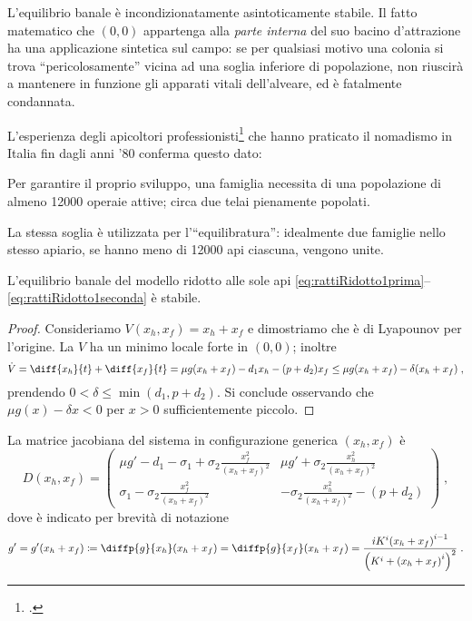 L'equilibrio banale è incondizionatamente asintoticamente stabile.
Il fatto matematico che $(0,0)$ appartenga alla \emph{parte interna} del suo bacino d'attrazione
ha una applicazione sintetica sul campo: se per qualsiasi motivo una colonia si trova ``pericolosamente''
vicina ad una soglia inferiore di popolazione, non riuscirà a mantenere in funzione gli apparati vitali
dell'alveare, ed è fatalmente condannata.

L'esperienza degli apicoltori professionisti\footcite{privFDL,privFPan} che hanno praticato il nomadismo in Italia
fin dagli anni '80 conferma questo dato:
\begin{displayquote}
Per garantire il proprio sviluppo, una famiglia necessita di una popolazione di
almeno 12000 operaie attive; circa due telai pienamente popolati.

La stessa soglia è utilizzata per l'``equilibratura'': idealmente due famiglie nello stesso apiario,
se hanno meno di 12000 api ciascuna, vengono unite.
\end{displayquote}

\begin{proposizione}
    L'equilibrio banale del modello ridotto alle sole api
    \eqref{eq:rattiRidotto1prima}--\eqref{eq:rattiRidotto1seconda}
    è stabile.
    \label{prop:r0Stab2d}
\end{proposizione}

\begin{proof}
Consideriamo $V(x_h, x_f) = x_h + x_f$ e dimostriamo che è di Lyapounov per l'origine.
La $V$ ha un minimo locale forte in $(0,0)$; inoltre
$$\dot{V} = \diff{x_h}{t} + \diff{x_f}{t} = \mu g(x_h + x_f) -d_1 x_h - (p+d_2) x_f
\leq
 \mu g(x_h + x_f) - \delta (x_h + x_f)
\; ,$$
prendendo $0 < \delta \leq \min (d_1, p + d_2)$.
Si conclude osservando che $\mu g(x) - \delta x <0$ per $x>0$ sufficientemente piccolo.
\end{proof}

La matrice jacobiana del sistema in configurazione generica $(x_h, x_f)$ è
\begin{equation}
    D(x_h, x_f) =
    \begin{pmatrix}
        \mu g' -d_1 - \sigma_1 + \sigma_2 \frac{x_f^2}{{(x_h+x_f)}^2}
        & \mu g' + \sigma_2 \frac{x_h^2}{{(x_h+x_f)}^2}
        \\
        \sigma_1 - \sigma_2 \frac{x_f^2}{{(x_h+x_f)}^2}
        & - \sigma_2 \frac{x_h^2}{{(x_h+x_f)}^2} - (p+d_2)
    \end{pmatrix} \; ,
    \label{eq:r17jaco}
\end{equation}
dove è indicato per brevità di notazione
\begin{equation}
    g' = g'(x_h+x_f) \coloneq \diffp{g}{{x_h}} (x_h + x_f) = \diffp{g}{{x_f}} (x_h + x_f) =
    \frac{ iK^i {(x_h + x_f)}^{i-1} }{ { \left( K^i + {(x_h +x_f)}^i \right)  }^2 }
    \; .
    \label{eq:gPrimo}
\end{equation}

